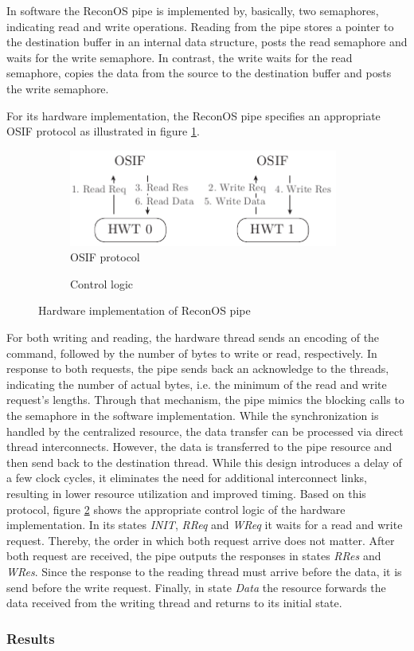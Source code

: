 In software the ReconOS pipe is implemented by, basically, two semaphores,
indicating read and write operations. Reading from the pipe stores a pointer
to the destination buffer in an internal data structure, posts the read
semaphore and waits for the write semaphore. In contrast, the write waits for
the read semaphore, copies the data from the source to the destination buffer
and posts the write semaphore.

For its hardware implementation, the ReconOS pipe specifies an appropriate
\ac{OSIF} protocol as illustrated in figure \ref{fig:pipe_hw_osif}.
\begin{figure}
	\centering
	\begin{subfigure}{0.49\textwidth}
		\centering
		\includegraphics[width=0.97\textwidth]{../figures/pipe_osif}
		\caption{\acs{OSIF} protocol}
		\label{fig:pipe_hw_osif}
	\end{subfigure}
	\begin{subfigure}{0.49\textwidth}
		\centering
		\caption{Control logic}
		\label{fig:pipe_hw_fsm}
	\end{subfigure}
	\caption{Hardware implementation of ReconOS pipe}
	\label{fig:pipe_hw}
\end{figure}
For both writing and reading, the hardware thread sends an encoding of the
command, followed by the number of bytes to write or read, respectively. In
response to both requests, the pipe sends back an acknowledge to the threads,
indicating the number of actual bytes, i.e. the minimum of the read and write
request's lengths. Through that mechanism, the pipe mimics the blocking calls
to the semaphore in the software implementation. While the synchronization is
handled by the centralized resource, the data transfer can be processed via
direct thread interconnects. However, the data is transferred to the pipe
resource and then send back to the destination thread. While this design
introduces a delay of a few clock cycles, it eliminates the need for
additional interconnect links, resulting in lower resource utilization and
improved timing. Based on this protocol, figure \ref{fig:pipe_hw_fsm} shows
the appropriate control logic of the hardware implementation. In its states
\emph{INIT}, \emph{RReq} and \emph{WReq} it waits for a read and write request.
Thereby, the order in which both request arrive does not matter. After both
request are received, the pipe outputs the responses in states \emph{RRes} and
\emph{WRes}. Since the response to the reading thread must arrive before the
data, it is send before the write request. Finally, in state \emph{Data} the
resource forwards the data received from the writing thread and returns to its
initial state.

\subsubsection{Results}